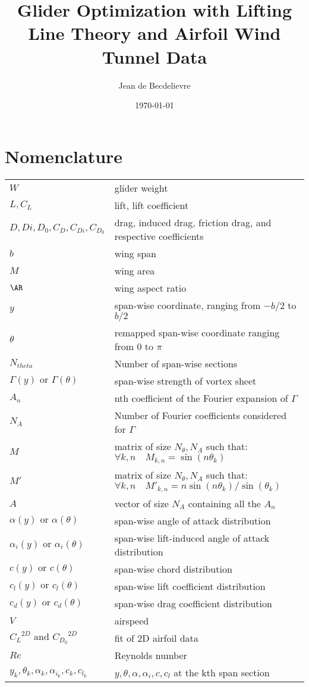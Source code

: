 \documentclass[letterpaper,12pt]{article}
\begin{document}
\title{Glider Optimization with Lifting Line Theory and Airfoil Wind Tunnel Data}
\author{Jean de Becdelievre}
\date{\today}
\maketitle

\section{Nomenclature}

{\renewcommand\arraystretch{1.0}
\noindent\begin{longtable}{@{}l @{\quad : \quad} l@{}}
$W$  & glider weight \\
$L, C_L$ & lift, lift coefficient \\
$D,Di,D_0, C_D,C_{Di},C_{D_0}$& drag, induced drag, friction drag, and respective coefficients \\
$b$ & wing span \\
$M$ & wing area \\
$\AR$ & wing aspect ratio \\
$y$ & span-wise coordinate, ranging from $-b/2$ to $b/2$ \\
$\theta$ & remapped span-wise coordinate ranging from $0$ to $\pi$ \\
$N_{theta}$ & Number of span-wise sections \\
$\Gamma(y) \text{ or } \Gamma(\theta)$ & span-wise strength of vortex sheet\\
$A_n$ & nth coefficient of the Fourier expansion of $\Gamma$ \\
$N_{A}$ & Number of Fourier coefficients considered for $\Gamma$ \\
$M$ & matrix of size $N_{\theta}, N_A$ such that: $ \forall k,n \quad M_{k,n} = \sin(n\theta_k)$ \\
$M'$ & matrix of size $N_{\theta}, N_A$ such that: $ \forall k,n \quad {M'}_{k,n} = n\sin(n\theta_k)/\sin(\theta_k)$ \\
$A$ & vector of size $N_A$ containing all the $A_n$ \\
$\alpha(y) \text{ or } \alpha(\theta)$ & span-wise angle of attack distribution\\
$\alpha_i(y) \text{ or } \alpha_i(\theta)$ & span-wise lift-induced angle of attack distribution\\
$c(y) \text{ or } c(\theta)$ & span-wise chord distribution\\
$c_l(y) \text{ or } c_l(\theta)$ & span-wise lift coefficient distribution\\
$c_d(y) \text{ or } c_d(\theta)$ & span-wise drag coefficient distribution\\
$V$ & airspeed \\
${C_L}^{2D} \text{ and } {C_{D_0}}^{2D}$ & fit of 2D airfoil data \\
$Re$ & Reynolds number \\
$y_k, \theta_k, \alpha_k, \alpha_{i_k}, c_k, c_{l_k}$ &  $y, \theta, \alpha, \alpha_i, c, c_{l}$ at the kth span section\\
\end{longtable}}
\end{document}
